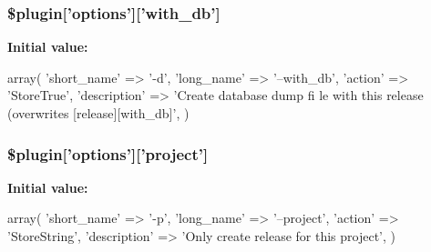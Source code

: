 \hypertarget{plugin__release-create_8class_8php_a71f19a8180c0825c53d2418ec3f1b377}{
\subsubsection[{\$plugin}]{\setlength{\rightskip}{0pt plus 5cm}\$plugin\mbox{[}'options'\mbox{]}\mbox{[}'with\_\-db'\mbox{]}}}
\label{plugin__release-create_8class_8php_a71f19a8180c0825c53d2418ec3f1b377}
{\bfseries Initial value:}
\begin{DoxyCode}
 array(
                                        'short_name'  => '-d',
                                        'long_name'   => '--with_db',
                                        'action'      => 'StoreTrue',
                                        'description' => 'Create database dump fi
      le with this release (overwrites [release][with_db]',
                                      )
\end{DoxyCode}
\hypertarget{plugin__release-create_8class_8php_ab3f61fdb66a7c26d551a861f8aee75c7}{
\subsubsection[{\$plugin}]{\setlength{\rightskip}{0pt plus 5cm}\$plugin\mbox{[}'options'\mbox{]}\mbox{[}'project'\mbox{]}}}
\label{plugin__release-create_8class_8php_ab3f61fdb66a7c26d551a861f8aee75c7}
{\bfseries Initial value:}
\begin{DoxyCode}
 array(
                                  'short_name'  => '-p',
                                  'long_name'   => '--project',
                                  'action'      => 'StoreString',
                                  'description' => 'Only create release for this 
      project',
                                )
\end{DoxyCode}
